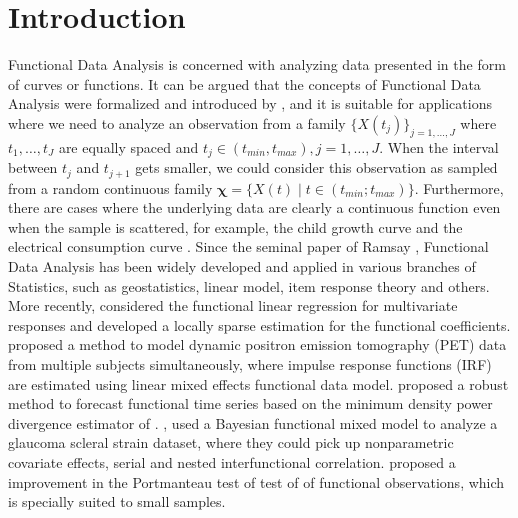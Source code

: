 \documentclass[]{interact}
\theoremstyle{plain}%
\theoremstyle{definition}
\theoremstyle{remark}
\begin{document}
\hypertarget{introduction}{%
\section{Introduction}\label{introduction}}

Functional Data Analysis is concerned with analyzing data presented in the form of curves or functions. It can be argued that the concepts of Functional Data Analysis were formalized and introduced
by \citet{ramsay1991some}, and it is suitable for applications where we need to analyze an observation from a family \(\{X(t_j)\}_{j=1, \dots, J}\) where \(t_1, \dots, t_J\) are equally spaced and \(t_j \in (t_{min}, t_{max}), j=1, \dots, J\). When the interval between \(t_j\) and \(t_{j+1}\) gets smaller, we could consider this observation as sampled from a random continuous family \(\bm{\chi} = \{X(t) \mid t \in (t_{min}; t_{max}) \}\).
Furthermore, there are cases where the underlying data are clearly a continuous function even when the sample is scattered, for example, the child growth curve and the
electrical consumption curve \citep{ferraty2006nonparametric}.
Since the seminal paper of Ramsay \citet{ramsay1991some},
Functional Data Analysis has been widely developed and applied in various branches of Statistics, such as geostatistics, linear model, item response theory and others. More recently, \citet{kuangman2020} considered the functional linear regression for multivariate responses and developed a locally sparse estimation for the functional coefficients. \citet{chen2018} proposed a method to model dynamic positron emission tomography (PET) data from multiple subjects simultaneously, where impulse response functions (IRF) are estimated using linear mixed effects functional data model. \citet{beyaztas2019forecasting} proposed a robust method to forecast functional time series based on the minimum density power divergence estimator of \citet{basu1998robust}. \citet{lee2019bayesian}, used a Bayesian functional mixed model to analyze a glaucoma scleral strain dataset, where they could pick up nonparametric covariate effects, serial and nested interfunctional correlation. \citet{zamani2019improved} proposed a improvement in the Portmanteau test of test of \citet{gabrys2007portmanteau} of functional observations, which is specially suited to small samples.
\end{document}
